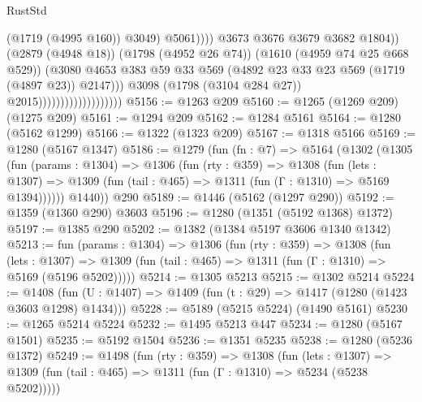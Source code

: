 \begin{lexlean}{RustStd}
\begin{coremodule}
                                                          (@1719 (@4995 @160))
                                                          @3049)
                                                        @5061))))
                                                @3673
                                                @3676
                                                @3679
                                                @3682
                                                @1804))
                                            (@2879 (@4948 @18))
                                            (@1798 (@4952 @26 @74))
                                            (@1610 (@4959 @74 @25 @668 @529))
                                            (@3080
                                              @4653
                                              @383
                                              @59
                                              @33
                                              @569
                                              (@4892 @23 @33 @23 @569 (@1719 (@4897 @23)) @2147)))
                                          @3098
                                          (@1798 (@3104 @284 @27))
                                          @2015)))))))))))))))))))
@5156 := @1263 @209
@5160 := @1265 (@1269 @209) (@1275 @209)
@5161 := @1294 @209
@5162 := @1284 @5161
@5164 := @1280 (@5162 @1299)
@5166 := @1322 (@1323 @209)
@5167 := @1318 @5166
@5169 := @1280 (@5167 @1347)
@5186 := @1279
    (fun (fn : @7) =>
    @5164
      (@1302
        (@1305
          (fun (params : @1304) =>
          @1306
            (fun (rty : @359) =>
            @1308
              (fun (lets : @1307) =>
              @1309 (fun (tail : @465) => @1311 (fun (Γ : @1310) => @5169 @1394))))))
        @1440))
    @290
@5189 := @1446 (@5162 (@1297 @290))
@5192 := @1359 (@1360 @290) @3603
@5196 := @1280 (@1351 (@5192 @1368) @1372)
@5197 := @1385 @290
@5202 := @1382 (@1384 @5197 @3606 @1340 @1342)
@5213 := fun (params : @1304) =>
  @1306
    (fun (rty : @359) =>
    @1308
      (fun (lets : @1307) =>
      @1309 (fun (tail : @465) => @1311 (fun (Γ : @1310) => @5169 (@5196 @5202)))))
@5214 := @1305 @5213
@5215 := @1302 @5214
@5224 := @1408 (fun (U : @1407) => @1409 (fun (t : @29) => @1417 (@1280 (@1423 @3603 @1298) @1434)))
@5228 := @5189 (@5215 @5224) (@1490 @5161)
@5230 := @1265 @5214 @5224
@5232 := @1495 @5213 @447
@5234 := @1280 (@5167 @1501)
@5235 := @5192 @1504
@5236 := @1351 @5235
@5238 := @1280 (@5236 @1372)
@5249 := @1498
    (fun (rty : @359) =>
    @1308
      (fun (lets : @1307) =>
      @1309 (fun (tail : @465) => @1311 (fun (Γ : @1310) => @5234 (@5238 @5202)))))

\end{coremodule}
\end{lexlean}
